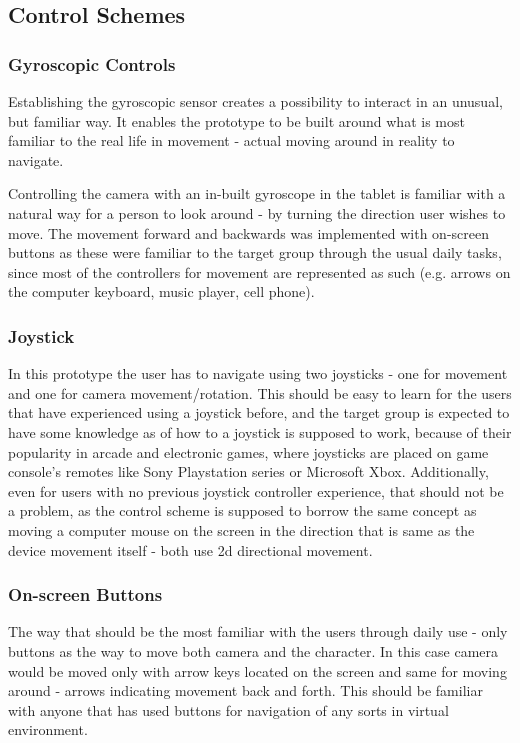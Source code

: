 \subsection{Control Schemes}
\subsubsection{Gyroscopic Controls}
Establishing the gyroscopic sensor creates a possibility to interact in an unusual, but familiar way. It enables the prototype to be built around what is most familiar to the real life in movement - actual moving around in reality to navigate.

Controlling the camera with an in-built gyroscope in the tablet is familiar with a natural way for a person to look around - by turning the direction user wishes to move. The movement forward and backwards was implemented with on-screen buttons as these were familiar to the target group through the usual daily tasks, since most of the controllers for movement are represented as such (e.g. arrows on the computer keyboard, music player, cell phone).

\subsubsection{Joystick}
In this prototype the user has to navigate using two joysticks - one for movement and one for camera movement/rotation. This should be easy to learn for the users that have experienced using a joystick before, and the target group is expected to have some knowledge as of how to a joystick is supposed to work, because of their popularity in arcade and electronic games, where joysticks are placed on game console’s remotes like Sony Playstation series or Microsoft Xbox. Additionally, even for users with no previous joystick controller experience, that should not be a problem, as the control scheme is supposed to borrow the same concept as moving a computer mouse on the screen in the direction that is same as the device movement itself - both use 2d directional movement.

\subsubsection{On-screen Buttons}
The way that should be the most familiar with the users through daily use - only buttons as the way to move both camera and the character. In this case camera would be moved only with arrow keys located on the screen and same for moving around - arrows indicating movement back and forth. This should be familiar with anyone that has used buttons for navigation of any sorts in virtual environment. 

